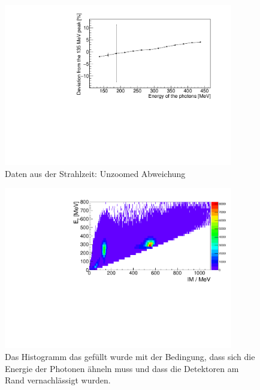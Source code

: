 \documentclass[a4paper,11pt,oneside,final,german,openbib,pdftex]{scrbook}
\begin{document}
{\begin{appendix}
\begin{figure}[h!]
	\begin{center}
		\includegraphics[width=100mm]{201728104StrahlzeitNoCutUnzoomed}
		\caption[Strahlzeit: Unzoomed Abweichung]{Daten aus der Strahlzeit: Unzoomed Abweichung}
		\label{fig:Unzoomed}
	\end{center}
\end{figure}




\begin{figure}[h!]
	\begin{center}
		\includegraphics[width=100mm]{NewCalib/Strahlzeit2014/20171904Real30DegreeCutHist}
		\caption[Strahlzeit: 2D-Hist ohne Detektoren am Rand]{Das Histogramm das gef\"ullt wurde mit der Bedingung, dass sich die Energie der Photonen \"ahneln muss und dass die Detektoren am Rand vernachl\"assigt wurden.}
		\label{fig:30-Degree-Cut-Histogramm}
	\end{center}
\end{figure}



\end{appendix}}
\end{document}
